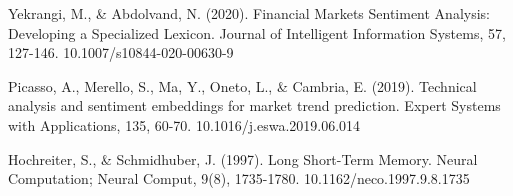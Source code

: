\documentclass{llncs}
\begin{document}
\begin{thebibliography}{8}
\label{ref_article18}
Yekrangi, M., \& Abdolvand, N. (2020). Financial Markets Sentiment Analysis: Developing a Specialized Lexicon. Journal of Intelligent Information Systems, 57, 127-146. 10.1007/s10844-020-00630-9

\label{ref_article19}
Picasso, A., Merello, S., Ma, Y., Oneto, L., \& Cambria, E. (2019). Technical analysis and sentiment embeddings for market trend prediction. Expert Systems with Applications, 135, 60-70. 10.1016/j.eswa.2019.06.014

\label{ref_article20}
Hochreiter, S., \& Schmidhuber, J. (1997). Long Short-Term Memory. Neural Computation; Neural Comput, 9(8), 1735-1780. 10.1162/neco.1997.9.8.1735

\end{thebibliography}
\end{document}
